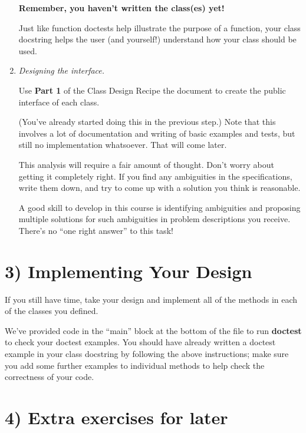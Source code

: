 \documentclass[12pt]{article}
\begin{document}
\begin{enumerate}[1.]
\textbf{Remember, you haven’t written the class(es) yet!}

Just like function doctests help illustrate the purpose of a function, your class
docstring helps the user (and yourself!) understand how your class should be used.

\item \textit{Designing the interface.}

Use \textbf{Part 1} of the Class Design Recipe the document to create the public
interface of each class.

(You’ve already started doing this in the previous step.) Note that this involves
a lot of documentation and writing of basic examples and tests, but still no
implementation whatsoever. That will come later.

\bigskip

This analysis will require a fair amount of thought. Don’t worry about getting it
completely right. If you find any ambiguities in the specifications, write them
down, and try to come up with a solution you think is reasonable.

\bigskip

A good skill to develop in this course is identifying ambiguities and proposing
multiple solutions for such ambiguities in problem descriptions you receive.
There’s no “one right answer” to this task!

\end{enumerate}

\bigskip

\section*{3) Implementing Your Design}

If you still have time, take your design and implement all of the methods in each
of the classes you defined.

\bigskip

\noindent We’ve provided code in the “main” block at the bottom of the file to
run \textbf{doctest} to check your doctest examples. You should have already
written a doctest example in your class docstring by following the above instructions;
make sure you add some further examples to individual methods to help check the
correctness of your code.

\bigskip

\section*{4) Extra exercises for later}
\end{document}

